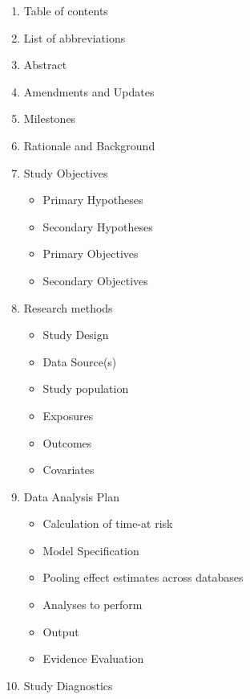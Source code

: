 \documentclass[10.5pt]{book}
\providecommand{\tightlist}{%
  \setlength{\itemsep}{0pt}\setlength{\parskip}{0pt}}
\theoremstyle{definition}
\theoremstyle{definition}
\theoremstyle{definition}
\theoremstyle{remark}
\begin{document}
\begin{enumerate}
\def\labelenumi{\arabic{enumi}.}
\tightlist
\item
  Table of contents\\
\item
  List of abbreviations\\
\item
  Abstract
\item
  Amendments and Updates\\
\item
  Milestones\\
\item
  Rationale and Background
\item
  Study Objectives

  \begin{itemize}
  \tightlist
  \item
    Primary Hypotheses\\
  \item
    Secondary Hypotheses\\
  \item
    Primary Objectives\\
  \item
    Secondary Objectives\\
  \end{itemize}
\item
  Research methods

  \begin{itemize}
  \tightlist
  \item
    Study Design\\
  \item
    Data Source(s)\\
  \item
    Study population\\
  \item
    Exposures
  \item
    Outcomes\\
  \item
    Covariates\\
  \end{itemize}
\item
  Data Analysis Plan

  \begin{itemize}
  \tightlist
  \item
    Calculation of time-at risk\\
  \item
    Model Specification\\
  \item
    Pooling effect estimates across databases
  \item
    Analyses to perform\\
  \item
    Output\\
  \item
    Evidence Evaluation\\
  \end{itemize}
\item
  Study Diagnostics


\end{enumerate}
\end{document}
